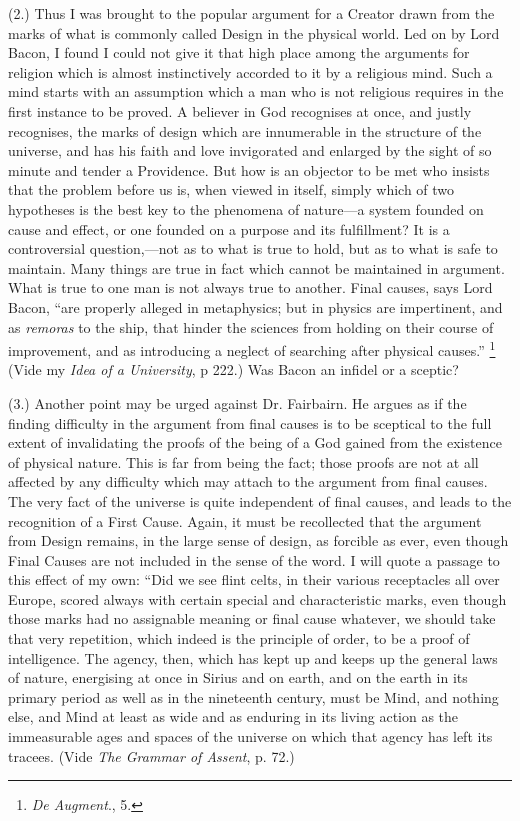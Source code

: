(2.) Thus I was brought to the popular argument
for a Creator drawn from the marks of what is commonly called Design
in the physical world. Led on by Lord Bacon, I found I could not give
it that high place among the arguments for religion which is almost
instinctively accorded to it by a religious mind. Such a mind starts
with an assumption which a man who is not religious requires in the
first instance to be proved. A believer in God recognises at once, and
justly recognises, the marks of design which are innumerable in the
structure of the universe, and has his faith and love invigorated and
enlarged by the sight of so minute and tender a Providence. But how is
an objector to be met who insists that the problem before us is, when
viewed in itself, simply which of two hypotheses is the best key to
the phenomena of nature—a system founded on cause and effect, or one
founded on a purpose and its fulfillment? It is a controversial
question,—not as to what is true to hold, but as to what is safe to
maintain. Many things are true in fact which cannot be maintained in
argument. What is true to one man is not always true to another. Final
causes, says Lord Bacon, ``are properly alleged in metaphysics; but in
physics are impertinent, and as \emph{remoras} to the ship, that
hinder the sciences from holding on their course of improvement, and as introducing a neglect of searching after physical causes.'' \footnote{\emph{De Augment}., 5.} (Vide my \emph{Idea of a University}, p 222.) Was Bacon an
infidel or a sceptic?

(3.) Another point may be urged against Dr.
Fairbairn. He argues as if the finding difficulty in the argument from
final causes is to be sceptical to the full extent of invalidating the
proofs of the being of a God gained from the existence of physical
nature. This is far from being the fact; those proofs are not at all
affected by any difficulty which may attach to the argument from final
causes. The very fact of the universe is quite independent of final
causes, and leads to the recognition of a First Cause. Again, it must
be recollected that the argument from Design remains, in the large
sense of design, as forcible as ever, even though Final Causes are not
included in the sense of the word. I will quote a passage to this
effect of my own: ``Did we see flint celts, in their various
receptacles all over Europe, scored always with certain special and
characteristic marks, even though those marks had no assignable
meaning or final cause whatever, we should take that very repetition,
which indeed is the principle of order, to be a proof of intelligence.
The agency, then, which has kept up and keeps up the general laws of
nature, energising at once in Sirius and on earth, and on the
earth in its primary period as well as in the nineteenth century, must
be Mind, and nothing else, and Mind at least as wide and as enduring
in its living action as the immeasurable ages and spaces of the
universe on which that agency has left its tracees. (Vide \emph{The
Grammar of Assent}, p. 72.)

